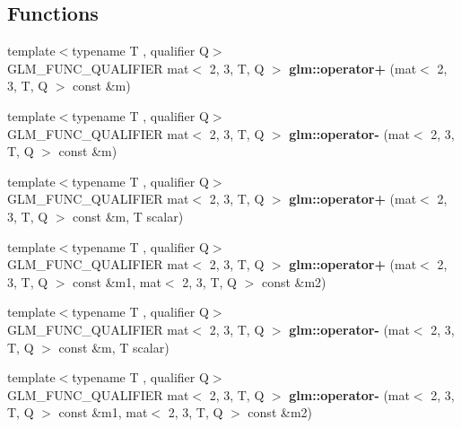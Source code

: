 \subsection*{Functions}
\begin{DoxyCompactItemize}
\item 
\mbox{\label{type__mat2x3_8inl_aa1f73398af5f763d7931971c9689dbe3}} 
{\footnotesize template$<$typename T , qualifier Q$>$ }\\G\+L\+M\+\_\+\+F\+U\+N\+C\+\_\+\+Q\+U\+A\+L\+I\+F\+I\+ER mat$<$ 2, 3, T, Q $>$ {\bfseries glm\+::operator+} (mat$<$ 2, 3, T, Q $>$ const \&m)
\item 
\mbox{\label{type__mat2x3_8inl_a278060281a7c2d30e3e1a2e6cd86810d}} 
{\footnotesize template$<$typename T , qualifier Q$>$ }\\G\+L\+M\+\_\+\+F\+U\+N\+C\+\_\+\+Q\+U\+A\+L\+I\+F\+I\+ER mat$<$ 2, 3, T, Q $>$ {\bfseries glm\+::operator-\/} (mat$<$ 2, 3, T, Q $>$ const \&m)
\item 
\mbox{\label{type__mat2x3_8inl_a243a603e47a68a127d5909d7f7d9daa8}} 
{\footnotesize template$<$typename T , qualifier Q$>$ }\\G\+L\+M\+\_\+\+F\+U\+N\+C\+\_\+\+Q\+U\+A\+L\+I\+F\+I\+ER mat$<$ 2, 3, T, Q $>$ {\bfseries glm\+::operator+} (mat$<$ 2, 3, T, Q $>$ const \&m, T scalar)
\item 
\mbox{\label{type__mat2x3_8inl_a0594f5c9a4b67832c76321577036da53}} 
{\footnotesize template$<$typename T , qualifier Q$>$ }\\G\+L\+M\+\_\+\+F\+U\+N\+C\+\_\+\+Q\+U\+A\+L\+I\+F\+I\+ER mat$<$ 2, 3, T, Q $>$ {\bfseries glm\+::operator+} (mat$<$ 2, 3, T, Q $>$ const \&m1, mat$<$ 2, 3, T, Q $>$ const \&m2)
\item 
\mbox{\label{type__mat2x3_8inl_a0bb2c4a178e5e0af2eed47ad72602105}} 
{\footnotesize template$<$typename T , qualifier Q$>$ }\\G\+L\+M\+\_\+\+F\+U\+N\+C\+\_\+\+Q\+U\+A\+L\+I\+F\+I\+ER mat$<$ 2, 3, T, Q $>$ {\bfseries glm\+::operator-\/} (mat$<$ 2, 3, T, Q $>$ const \&m, T scalar)
\item 
\mbox{\label{type__mat2x3_8inl_aab1c426eaf42adf444a5382dda77265a}} 
{\footnotesize template$<$typename T , qualifier Q$>$ }\\G\+L\+M\+\_\+\+F\+U\+N\+C\+\_\+\+Q\+U\+A\+L\+I\+F\+I\+ER mat$<$ 2, 3, T, Q $>$ {\bfseries glm\+::operator-\/} (mat$<$ 2, 3, T, Q $>$ const \&m1, mat$<$ 2, 3, T, Q $>$ const \&m2)

\end{DoxyCompactItemize}
